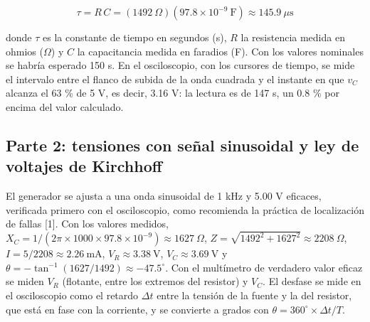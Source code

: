 \documentclass[11pt,letterpaper]{article}
\begin{document}
\begin{equation}
  \tau = R\,C = (1492\ \Omega)(97.8 \times 10^{-9}\ \text{F}) \approx 145.9\ \mu\text{s}
\end{equation}

donde $\tau$ es la constante de tiempo en segundos (s), $R$ la resistencia medida en ohmios (\ensuremath{\Omega}) y $C$ la capacitancia medida en faradios (F). Con los valores nominales se habría esperado 150 \textmu{}s. En el osciloscopio, con los cursores de tiempo, se mide el intervalo entre el flanco de subida de la onda cuadrada y el instante en que $v_C$ alcanza el 63 \% de 5 V, es decir, 3.16 V: la lectura es de 147 \textmu{}s, un 0.8 \% por encima del valor calculado.

\subsection{Parte 2: tensiones con señal sinusoidal y ley de voltajes de Kirchhoff}

El generador se ajusta a una onda sinusoidal de 1 kHz y 5.00 V eficaces, verificada primero con el osciloscopio, como recomienda la práctica de localización de fallas [1]. Con los valores medidos, $X_C = 1/(2\pi \times 1000 \times 97.8 \times 10^{-9}) \approx 1627\ \Omega$, $Z = \sqrt{1492^2 + 1627^2} \approx 2208\ \Omega$, $I = 5 / 2208 \approx 2.26\ \text{mA}$, $V_R \approx 3.38\ \text{V}$, $V_C \approx 3.69\ \text{V}$ y $\theta = -\tan^{-1}(1627/1492) \approx -47.5^\circ$. Con el multímetro de verdadero valor eficaz se miden $V_R$ (flotante, entre los extremos del resistor) y $V_C$. El desfase se mide en el osciloscopio como el retardo $\Delta t$ entre la tensión de la fuente y la del resistor, que está en fase con la corriente, y se convierte a grados con $\theta = 360^\circ \times \Delta t / T$.
\end{document}

